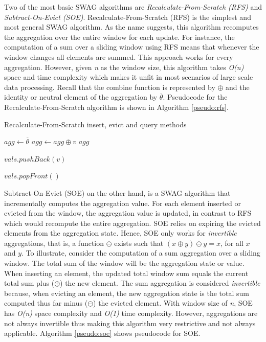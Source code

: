Two of the most basic SWAG algorithms are \textit{Recalculate-From-Scratch (RFS)} and \textit{Subtract-On-Evict (SOE)}. Recalculate-From-Scratch (RFS) is the simplest and most general SWAG algorithm. As the name suggests, this algorithm recomputes the aggregation over the entire window for each update. For instance, the computation of a sum over a sliding window using RFS means that whenever the window changes all elements are summed. This approach works for every aggregation. However, given \textit{n} as the window size, this algorithm takes \textit{O(n)} space and time complexity which makes it unfit in most scenarios of large scale data processing. Recall that the combine function is represented by $\oplus$ and the identity or neutral element of the aggregation by $\overline{\theta}$. Pseudocode for the Recalculate-From-Scratch algorithm is shown in Algorithm \ref{pseudo:rfs}.
  

\begin{algorithm}
    \caption{Recalculate-From-Scratch insert, evict and query methods}
    \label{pseudo:rfs}
    \begin{algorithmic}[1]
            \State $agg\gets\overline{\theta}$
                \State $agg \gets agg \oplus v$
            \EndFor
            \State \Return $agg$
        \EndFunction
        
        
        
            \State $vals.pushBack(v)$
        \EndFunction
        
        
        
            \State $vals.popFront()$
        \EndFunction
    \end{algorithmic}
\end{algorithm}

Subtract-On-Evict (SOE) on the other hand, is a SWAG algorithm that incrementally computes the aggregation value. For each element inserted or evicted from the window, the aggregation value is updated, in contrast to RFS which would recompute the entire aggregation. SOE relies on expiring the evicted elements from the aggregation state. Hence, SOE only works for \textit{invertible} aggregations, that is, a function $\ominus$ exists such that $(x \oplus y) \ominus y = x$, for all $x$ and $y$. To illustrate, consider the computation of a sum aggregation over a sliding window. The total sum of the window will be the aggregation state or value. When inserting an element, the updated total window sum equals the current total sum plus ($\oplus$) the new element. The sum aggregation is considered \textit{invertible} because, when evicting an element, the new aggregation state is the total sum computed thus far minus ($\ominus$) the evicted element. With window size of \textit{n}, SOE has \textit{O(n)} space complexity and \textit{O(1)} time complexity. However, aggregations are not always invertible thus making this algorithm very restrictive and not always applicable. Algorithm \ref{pseudo:soe} shows pseudocode for SOE.

